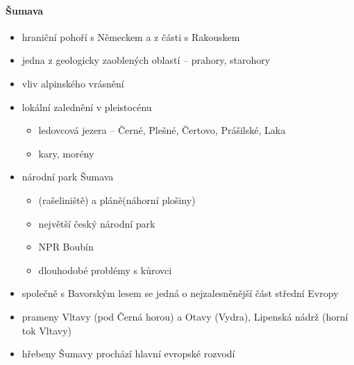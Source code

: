 \paragraph{Šumava}
\begin{itemize}
\item hraniční pohoří s Německem a z části s Rakouskem
\item jedna z geologicky zaoblených oblastí -- prahory, starohory
\item vliv alpinského vrásnění
\item lokální zalednění v pleistocénu
	\begin{itemize}
	\item ledovcová jezera -- Černé, Plešné, Čertovo, Prášilské, Laka
\item kary, morény
	\end{itemize}
\item národní park Šumava
	\begin{itemize}
	\item (rašeliniště) a pláně(náhorní plošiny)
	\item největší český národní park
	\item NPR Boubín
	\item dlouhodobé problémy s kůrovci
	\end{itemize}
\item společně s Bavorským lesem se jedná o nejzalesněnější část střední Evropy
\item prameny Vltavy (pod Černá horou) a Otavy (Vydra), Lipenská nádrž (horní tok Vltavy)
\item hřebeny Šumavy prochází hlavní evropské rozvodí
\end{itemize}

